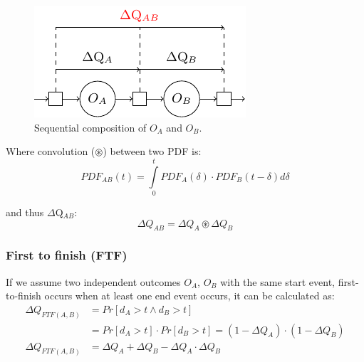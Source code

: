         \begin{figure}[H]
            \begin{center}
                \includegraphics[scale=1]{tikz/seq_comp.pdf}
            \end{center}
            \caption{Sequential composition of $O_A$ and $O_B$.}
        \end{figure}
        Where convolution ($\circledast$) between two PDF is:
        \begin{equation}
            PDF_{AB}(t) =\int\limits_0^t PDF_A(\delta) \cdot PDF_B(t-\delta)d\delta 
            \label{eq:}
        \end{equation}

            and thus $\Delta$Q$_{AB}$:
        \begin{equation}
            \Delta Q_{AB} = \Delta Q_A \circledast \Delta Q_B
            \label{eq:}
        \end{equation}
        
    \subsubsection{First to finish (FTF)}
            If we assume two independent outcomes $O_A$, $O_B$ with the same start event, first-to-finish occurs when at least one end event occurs, it can be calculated as:
        \begin{equation}
            \begin{split}
                \Delta Q_{FTF(A, B)} &= Pr[d_A > t \wedge d_B > t] \\
                & = Pr[d_A > t] \cdot Pr[d_B > t] = (1 - \Delta Q_A) \cdot (1 - \Delta Q_B) \\
                \Delta Q_{FTF(A, B)} &= \Delta Q_A + \Delta Q_B - \Delta Q_A \cdot \Delta Q_B  
            \end{split}    
            \label{eq:ftf} 
        \end{equation}

